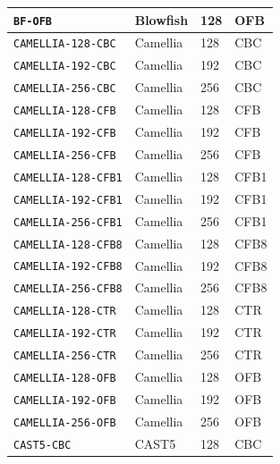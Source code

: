 \documentclass[synpaper]{book}
\begin{document}
\begin{table}[H]
\begin{small}
\begin{tabular}{|l|l|l|l|}
\hline \texttt{BF-OFB}            & Blowfish        & 128                       & OFB    \\
\hline \texttt{CAMELLIA-128-CBC}  & Camellia        & 128                       & CBC    \\
\hline \texttt{CAMELLIA-192-CBC}  & Camellia        & 192                       & CBC    \\
\hline \texttt{CAMELLIA-256-CBC}  & Camellia        & 256                       & CBC    \\
\hline \texttt{CAMELLIA-128-CFB}  & Camellia        & 128                       & CFB    \\
\hline \texttt{CAMELLIA-192-CFB}  & Camellia        & 192                       & CFB    \\
\hline \texttt{CAMELLIA-256-CFB}  & Camellia        & 256                       & CFB    \\
\hline \texttt{CAMELLIA-128-CFB1} & Camellia        & 128                       & CFB1   \\
\hline \texttt{CAMELLIA-192-CFB1} & Camellia        & 192                       & CFB1   \\
\hline \texttt{CAMELLIA-256-CFB1} & Camellia        & 256                       & CFB1   \\
\hline \texttt{CAMELLIA-128-CFB8} & Camellia        & 128                       & CFB8   \\
\hline \texttt{CAMELLIA-192-CFB8} & Camellia        & 192                       & CFB8   \\
\hline \texttt{CAMELLIA-256-CFB8} & Camellia        & 256                       & CFB8   \\
\hline \texttt{CAMELLIA-128-CTR}  & Camellia        & 128                       & CTR    \\
\hline \texttt{CAMELLIA-192-CTR}  & Camellia        & 192                       & CTR    \\
\hline \texttt{CAMELLIA-256-CTR}  & Camellia        & 256                       & CTR    \\
\hline \texttt{CAMELLIA-128-OFB}  & Camellia        & 128                       & OFB    \\
\hline \texttt{CAMELLIA-192-OFB}  & Camellia        & 192                       & OFB    \\
\hline \texttt{CAMELLIA-256-OFB}  & Camellia        & 256                       & OFB    \\
\hline \texttt{CAST5-CBC}         & CAST5           & 128                       & CBC    \\

\end{tabular}
\end{small}
\end{table}
\end{document}
